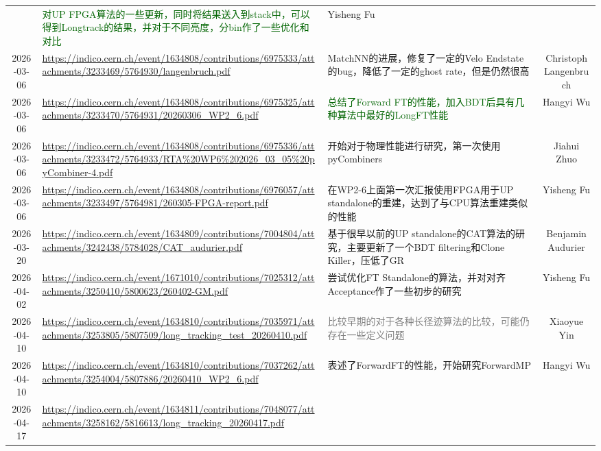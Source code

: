 \documentclass[UTF8]{article}
\newcommand{\green}[1]{\textcolor{darkgreen}{#1}}
\newcommand{\gray}[1]{\textcolor{gray}{#1}}
\begin{document}
\begin{longtable}{c>{\centering\arraybackslash}m{4cm}m{6cm}c}
        & \green{对UP FPGA算法的一些更新，同时将结果送入到stack中，可以得到Longtrack的结果，并对于不同亮度，分bin作了一些优化和对比}
        & Yisheng Fu \\
    2026-03-06 & \tiny\url{https://indico.cern.ch/event/1634808/contributions/6975333/attachments/3233469/5764930/langenbruch.pdf}
        & MatchNN的进展，修复了一定的Velo Endstate的bug，降低了一定的ghost rate，但是仍然很高
        & Christoph Langenbruch \\
    2026-03-06 & \tiny\url{https://indico.cern.ch/event/1634808/contributions/6975325/attachments/3233470/5764931/20260306_WP2_6.pdf}
        & \green{总结了Forward FT的性能，加入BDT后具有几种算法中最好的LongFT性能}
        & Hangyi Wu \\
    2026-03-06 & \tiny\url{https://indico.cern.ch/event/1634808/contributions/6975336/attachments/3233472/5764933/RTA%20WP6%202026_03_05%20pyCombiner-4.pdf}
        & 开始对于物理性能进行研究，第一次使用pyCombiners
        & Jiahui Zhuo \\
    2026-03-06 & \tiny\url{https://indico.cern.ch/event/1634808/contributions/6976057/attachments/3233497/5764981/260305-FPGA-report.pdf}
        & 在WP2-6上面第一次汇报使用FPGA用于UP standalone的重建，达到了与CPU算法重建类似的性能
        & Yisheng Fu \\
    2026-03-20 & \tiny\url{https://indico.cern.ch/event/1634809/contributions/7004804/attachments/3242438/5784028/CAT_audurier.pdf}
        & 基于很早以前的UP standalone的CAT算法的研究，主要更新了一个BDT filtering和Clone Killer，压低了GR
        & Benjamin Audurier \\
    2026-04-02 & \tiny\url{https://indico.cern.ch/event/1671010/contributions/7025312/attachments/3250410/5800623/260402-GM.pdf}
        & 尝试优化FT Standalone的算法，并对对齐Acceptance作了一些初步的研究
        & Yisheng Fu \\
    2026-04-10 & \tiny\url{https://indico.cern.ch/event/1634810/contributions/7035971/attachments/3253805/5807509/long_tracking_test_20260410.pdf}
        & \gray{比较早期的对于各种长径迹算法的比较，可能仍存在一些定义问题}
        & Xiaoyue Yin \\
    2026-04-10 & \tiny\url{https://indico.cern.ch/event/1634810/contributions/7037262/attachments/3254004/5807886/20260410_WP2_6.pdf}
        & 表述了ForwardFT的性能，开始研究ForwardMP
        & Hangyi Wu \\
    2026-04-17 & \tiny\url{https://indico.cern.ch/event/1634811/contributions/7048077/attachments/3258162/5816613/long_tracking_20260417.pdf}

\end{longtable}
\end{document}

